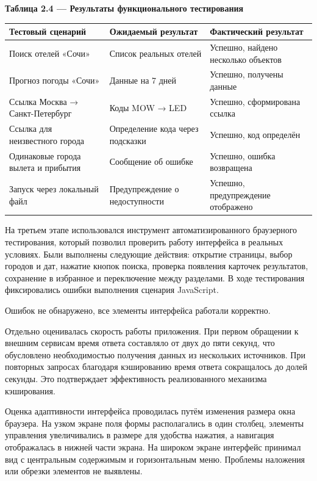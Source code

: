 \documentclass[14pt,a4paper,oneside]{extreport}
\begin{document}
\begin{table}[htbp]\centering

\textbf{Таблица 2.4 — Результаты функционального тестирования}\par\vspace{4pt}

\begin{center}
\small
\begin{tabularx}{\textwidth}{|X|X|X|}
\hline
Тестовый сценарий & Ожидаемый результат & Фактический результат \\
\hline
Поиск отелей «Сочи» & Список реальных отелей & Успешно, найдено несколько объектов \\
\hline
Прогноз погоды «Сочи» & Данные на 7 дней & Успешно, получены данные \\
\hline
Ссылка Москва → Санкт-Петербург & Коды MOW → LED & Успешно, сформирована ссылка \\
\hline
Ссылка для неизвестного города & Определение кода через подсказки & Успешно, код определён \\
\hline
Одинаковые города вылета и прибытия & Сообщение об ошибке & Успешно, ошибка возвращена \\
\hline
Запуск через локальный файл & Предупреждение о недоступности & Успешно, предупреждение отображено \\
\hline
\end{tabularx}
\end{center}

\end{table}

На третьем этапе использовался инструмент автоматизированного браузерного тестирования, который позволил проверить работу интерфейса в реальных условиях. Были выполнены следующие действия: открытие страницы, выбор городов и дат, нажатие кнопок поиска, проверка появления карточек результатов, сохранение в избранное и переключение между разделами. В ходе тестирования фиксировались ошибки выполнения сценария JavaScript.

Ошибок не обнаружено, все элементы интерфейса работали корректно.

Отдельно оценивалась скорость работы приложения. При первом обращении к внешним сервисам время ответа составляло от двух до пяти секунд, что обусловлено необходимостью получения данных из нескольких источников. При повторных запросах благодаря кэшированию время ответа сокращалось до долей секунды. Это подтверждает эффективность реализованного механизма кэширования.

Оценка адаптивности интерфейса проводилась путём изменения размера окна браузера. На узком экране поля формы располагались в один столбец, элементы управления увеличивались в размере для удобства нажатия, а навигация отображалась в нижней части экрана. На широком экране интерфейс принимал вид с центральным содержимым и горизонтальным меню. Проблемы наложения или обрезки элементов не выявлены.
\end{document}

